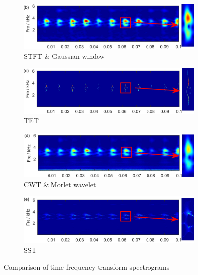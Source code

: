 \begin{figure}[ht]
    \centering
    \begin{subfigure}[b]{0.49\textwidth}
        \includegraphics[width=\textwidth]{assets/analysis/stft-spectrogram-sample.png}
        \caption{STFT \& Gaussian window}
    \end{subfigure}
    \hfill
    \begin{subfigure}[b]{0.49\textwidth}
        \includegraphics[width=\textwidth]{assets/analysis/tet-spectrogram-sample.png}
        \caption{TET}
    \end{subfigure}
    \hfill
    \begin{subfigure}[b]{0.49\textwidth}
        \includegraphics[width=\textwidth]{assets/analysis/wt-spectrogram-sample.png}
        \caption{CWT \& Morlet wavelet}
    \end{subfigure}
    \hfill
    \begin{subfigure}[b]{0.49\textwidth}
        \includegraphics[width=\textwidth]{assets/analysis/sst-spectrogram-sample.png}
        \caption{SST}
    \end{subfigure}
    \caption{Comparison of time-frequency transform spectrograms~\cite{yu_concentrated_2020}}
    \label{fig:transforms}
\end{figure}

